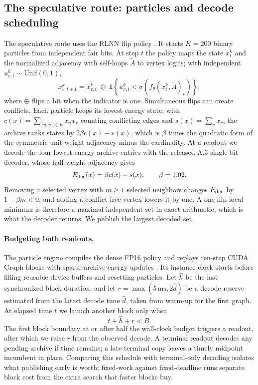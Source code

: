 \subsection{The speculative route: particles and decode scheduling}
The speculative route uses the RLNN flip policy \citep{feng2025regularized}. It starts \(K=200\) binary particles from independent fair bits. At step \(t\) the policy maps the state \(x^k_t\) and the normalized adjacency with self-loops \(\widetilde A\) to vertex logits; with independent \(u^k_{v,t}\sim\mathrm{Unif}(0,1)\),
\begin{equation}
 x^k_{v,t+1}=x^k_{v,t}\ \oplus\
 \mathbf{1}\!\left\{u^k_{v,t}<\sigma(f_\theta(x^k_t,\widetilde A)_v)\right\},
 \label{eq:policy-step}
\end{equation}
where \(\oplus\) flips a bit when the indicator is one. Simultaneous flips can create conflicts. Each particle keeps its lowest-energy state; with \(c(x)=\sum_{\{u,v\}\in E}x_ux_v\) counting conflicting edges and \(s(x)=\sum_v x_v\), the archive ranks states by \(2\beta c(x)-s(x)\), which is \(\beta\) times the quadratic form of the symmetric unit-weight adjacency minus the cardinality. At a readout we decode the four lowest-energy archive entries with the released A.3 single-bit decoder, whose half-weight adjacency gives
\begin{equation}
 E_{\rm dec}(x)=\beta c(x)-s(x),\qquad \beta=1.02 .
 \label{eq:decode-energy}
\end{equation}
Removing a selected vertex with \(m\geq1\) selected neighbors changes \(E_{\rm dec}\) by \(1-\beta m<0\), and adding a conflict-free vertex lowers it by one. A one-flip local minimum is therefore a maximal independent set in exact arithmetic, which is what the decoder returns. We publish the largest decoded set.

\paragraph{Budgeting both readouts.}
The particle engine compiles the dense FP16 policy and replays ten-step CUDA Graph blocks with sparse archive-energy updates \citep{gray2019cudagraphs,ansel2024pytorch}. Its instance clock starts before filling reusable device buffers and resetting particles. Let \(\widehat h\) be the last synchronized block duration, and let \(r=\max(5\,\mathrm{ms},2\widehat d)\) be a decode reserve estimated from the latest decode time \(\widehat d\), taken from warm-up for the first graph. At elapsed time \(t\) we launch another block only when
\begin{equation}
 t+\widehat h+r<B .
 \label{eq:launch}
\end{equation}
The first block boundary at or after half the wall-clock budget triggers a readout, after which we raise \(r\) from the observed decode. A terminal readout decodes any pending archive if time remains; a late terminal copy leaves a timely midpoint incumbent in place. Comparing this schedule with terminal-only decoding isolates what publishing early is worth; fixed-work against fixed-deadline runs separate block cost from the extra search that faster blocks buy.
